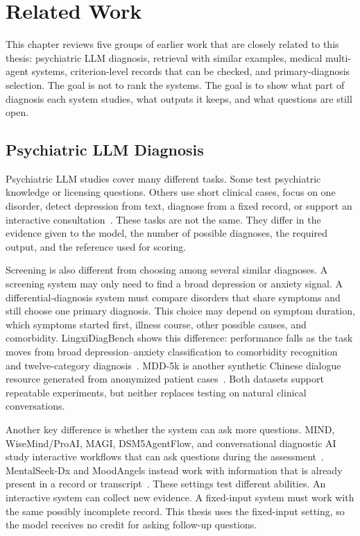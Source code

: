 \chapter{Related Work}
\label{ch:related}

This chapter reviews five groups of earlier work that are closely related to this thesis: psychiatric LLM diagnosis, retrieval with similar examples, medical multi-agent systems, criterion-level records that can be checked, and primary-diagnosis selection. The goal is not to rank the systems. The goal is to show what part of diagnosis each system studies, what outputs it keeps, and what questions are still open.

\section{Psychiatric LLM Diagnosis}

Psychiatric LLM studies cover many different tasks. Some test psychiatric knowledge or licensing questions. Others use short clinical cases, focus on one disorder, detect depression from text, diagnose from a fixed record, or support an interactive consultation~\citep{qiu2023largeai,li2024taiwan,raballo2025,sarma2025,li2025addreview,mcduff2025amie}. These tasks are not the same. They differ in the evidence given to the model, the number of possible diagnoses, the required output, and the reference used for scoring.

Screening is also different from choosing among several similar diagnoses. A screening system may only need to find a broad depression or anxiety signal. A differential-diagnosis system must compare disorders that share symptoms and still choose one primary diagnosis. This choice may depend on symptom duration, which symptoms started first, illness course, other possible causes, and comorbidity. LingxiDiagBench shows this difference: performance falls as the task moves from broad depression--anxiety classification to comorbidity recognition and twelve-category diagnosis~\citep{xu2026lingxidiagbench}. MDD-5k is another synthetic Chinese dialogue resource generated from anonymized patient cases~\citep{yin2024mdd5k}. Both datasets support repeatable experiments, but neither replaces testing on natural clinical conversations.

Another key difference is whether the system can ask more questions. MIND, WiseMind/ProAI, MAGI, DSM5AgentFlow, and conversational diagnostic AI study interactive workflows that can ask questions during the assessment~\citep{li2026mind,wu2026wisemind,bi2025magi,ozgun2025dsm5agentflow,tu2025conversational}. MentalSeek-Dx and MoodAngels instead work with information that is already present in a record or transcript~\citep{sun2026mentalseek,xiao2025moodangels}. These settings test different abilities. An interactive system can collect new evidence. A fixed-input system must work with the same possibly incomplete record. This thesis uses the fixed-input setting, so the model receives no credit for asking follow-up questions.

